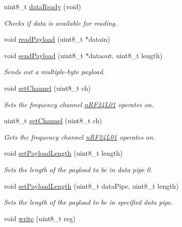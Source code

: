 \begin{DoxyCompactItemize}
uint8\-\_\-t \hyperlink{classn_r_f24_l01_a6741bcd4f708821352401b9881f77c59}{data\-Ready} (void)
\begin{DoxyCompactList}\small\item\em Checks if data is available for reading. \end{DoxyCompactList}\item 
void \hyperlink{classn_r_f24_l01_aa5e0e8a467af8cfcf264442f4d87411c}{read\-Payload} (uint8\-\_\-t $\ast$datain)
\item 
void \hyperlink{classn_r_f24_l01_a7fdf8f83f4f5a402f22aee6a20a7b581}{send\-Payload} (uint8\-\_\-t $\ast$dataout, uint8\-\_\-t length)
\begin{DoxyCompactList}\small\item\em Sends out a multiple-\/byte payload. \end{DoxyCompactList}\item 
void \hyperlink{classn_r_f24_l01_ad51e0ef24f71b5155f80cd9abb752fc4}{set\-Channel} (uint8\-\_\-t ch)
\begin{DoxyCompactList}\small\item\em Sets the frequency channel \hyperlink{classn_r_f24_l01}{n\-R\-F24\-L01} operates on. \end{DoxyCompactList}\item 
uint8\-\_\-t \hyperlink{classn_r_f24_l01_a835d79477f6d01ce0a0fb865799a2b01}{get\-Channel} (uint8\-\_\-t ch)
\begin{DoxyCompactList}\small\item\em Gets the frequency channel \hyperlink{classn_r_f24_l01}{n\-R\-F24\-L01} operates on. \end{DoxyCompactList}\item 
void \hyperlink{classn_r_f24_l01_ac6558318d4e55b6a79f2796047f0d9fe}{set\-Payload\-Length} (uint8\-\_\-t length)
\begin{DoxyCompactList}\small\item\em Sets the length of the payload to be in data pipe 0. \end{DoxyCompactList}\item 
void \hyperlink{classn_r_f24_l01_a467c306a3f9fa0e394cc30b8d8b53e3e}{set\-Payload\-Length} (uint8\-\_\-t data\-Pipe, uint8\-\_\-t length)
\begin{DoxyCompactList}\small\item\em Sets the length of the payload to be in specified data pipe. \end{DoxyCompactList}\item 
void \hyperlink{classn_r_f24_l01_ac635aa1fe319141a6291d179266f4094}{write} (uint8\-\_\-t reg)

\end{DoxyCompactItemize}
